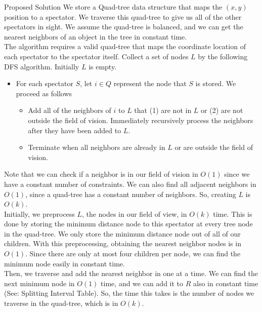 \documentclass[11pt]{article}
\begin{document}
\begin{section}{Proposed Solution}
We store a Quad-tree data structure that maps the $(x, y)$ position to a spectator. We traverse this quad-tree to give us all of the other spectators in sight. We assume the quad-tree is balanced, and we can get the nearest neighbors of an object in the tree in constant time. \\

The algorithm requires a valid quad-tree that maps the coordinate location of each spectator to the spectator itself. Collect a set of nodes $L$ by the following DFS algorithm. Initially $L$ is empty.
\begin{itemize} 
\item For each spectator $S$, let $i \in Q$ represent the node that $S$ is stored. We proceed as follows
\begin{itemize}
\item Add all of the neighbors of $i$ to $L$ that (1) are not in $L$ or (2) are not outside the field of vision. Immediately recursively process the neighbors after they have been added to $L$.
\item Terminate when all neighbors are already in $L$ or are outside the field of vision.
\end{itemize}
\end{itemize}

Note that we can check if a neighbor is in our field of vision in $O(1)$ since we have a constant number of constraints. We can also find all adjacent neighbors in $O(1)$, since a quad-tree has a constant number of neighbors. So, creating $L$ is $O(k)$. \\

Initially, we preprocess $L$, the nodes in our field of view, in $O(k)$ time. This is done by storing the minimum distance node to this spectator at every tree node in the quad-tree. We only store the minimum distance node out of all of our children. With this preprocessing, obtaining the nearest neighbor nodes is in $O(1)$. Since there are only at most four children per node, we can find the minimum node easily in constant time. \\

Then, we traverse and add the nearest neighbor in one at a time. We can find the next minimum node in $O(1)$ time, and we can add it to $R$ also in constant time (See: Splitting Interval Table). So, the time this takes is the number of nodes we traverse in the quad-tree, which is in $O(k)$. \\


\end{section}
\end{document}
